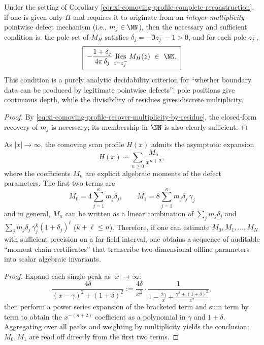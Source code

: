 \begin{corollary}\label{cor:xi-comoving-profile-integrality-test}
Under the setting of Corollary \ref{cor:xi-comoving-profile-complete-reconstruction}, if one is given only \(H\) and requires it to originate from an \emph{integer multiplicity} pointwise defect mechanism (i.e., \(m_j\in\NN\)),
then the necessary and sufficient condition is: the pole set of \(M_H\) satisfies \(\delta_j=-\Im z_j^- -1>0\), and for each pole \(z_j^-\),
\[
\boxed{\;
-\frac{1+\delta_j}{4\pi\,\delta_j}\operatorname*{Res}_{z=z_j^-} M_H(z)\ \in\ \NN.\;}
\]
This condition is a purely analytic decidability criterion for ``whether boundary data can be produced by legitimate pointwise defects'': pole positions give continuous depth, while the divisibility of residues gives discrete multiplicity.
\end{corollary}

\begin{proof}
By \eqref{eq:xi-comoving-profile-recover-multiplicity-by-residue}, the closed-form recovery of \(m_j\) is necessary; its membership in \(\NN\) is also clearly sufficient. \qedhere
\end{proof}

\begin{proposition}\label{prop:xi-scan-far-field-moment-expansion}
As \(|x|\to\infty\), the comoving scan profile \(H(x)\) admits the asymptotic expansion
\[
H(x)\sim \sum_{n\ge 0}\frac{M_n}{x^{n+2}},
\]
where the coefficients \(M_n\) are explicit algebraic moments of the defect parameters.
The first two terms are
\[
\boxed{\;
M_0=4\sum_{j=1}^{\kappa}m_j\delta_j,\qquad
M_1=8\sum_{j=1}^{\kappa}m_j\delta_j\,\gamma_j\;}
\]
and in general, \(M_n\) can be written as a linear combination of \(\sum_j m_j\delta_j\) and \(\sum_j m_j\delta_j\,\gamma_j^k(1+\delta_j)^\ell\) (\(k+\ell\le n\)).
Therefore, if one can estimate \(M_0,M_1,\dots,M_{N}\) with sufficient precision on a far-field interval, one obtains a sequence of auditable ``moment chain certificates'' that transcribe two-dimensional offline parameters into scalar algebraic invariants.
\end{proposition}

\begin{proof}
Expand each single peak as \(|x|\to\infty\):
\[
\frac{4\delta}{(x-\gamma)^2+(1+\delta)^2}
:=\frac{4\delta}{x^2}\cdot\frac{1}{1-\frac{2\gamma}{x}+\frac{\gamma^2+(1+\delta)^2}{x^2}},
\]
then perform a power series expansion of the bracketed term and sum term by term to obtain the \(x^{-(n+2)}\) coefficient as a polynomial in \(\gamma\) and \(1+\delta\).
Aggregating over all peaks and weighting by multiplicity yields the conclusion; \(M_0,M_1\) are read off directly from the first two terms. \qedhere
\end{proof}

